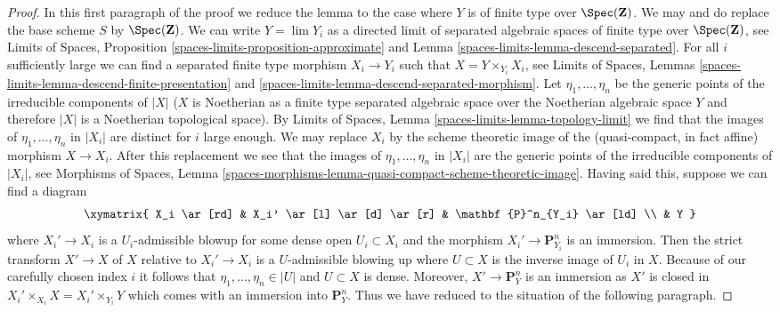 \begin{proof}
In this first paragraph of the proof we reduce the lemma to the case
where $Y$ is of finite type over $\Spec(\mathbf{Z})$.
We may and do replace the base scheme $S$ by $\Spec(\mathbf{Z})$.
We can write $Y = \lim Y_i$ as a directed limit of separated
algebraic spaces of finite type over $\Spec(\mathbf{Z})$, see
Limits of Spaces, Proposition \ref{spaces-limits-proposition-approximate} and
Lemma \ref{spaces-limits-lemma-descend-separated}.
For all $i$ sufficiently large we can find a separated finite type morphism
$X_i \to Y_i$ such that $X = Y \times_{Y_i} X_i$, see
Limits of Spaces, Lemmas
\ref{spaces-limits-lemma-descend-finite-presentation} and
\ref{spaces-limits-lemma-descend-separated-morphism}.
Let $\eta_1, \ldots, \eta_n$ be the generic points of the irreducible
components of $|X|$ ($X$ is Noetherian as a finite type separated
algebraic space over the Noetherian algebraic space $Y$ and therefore
$|X|$ is a Noetherian topological space).
By Limits of Spaces, Lemma \ref{spaces-limits-lemma-topology-limit}
we find that the images of $\eta_1, \ldots, \eta_n$ in $|X_i|$
are distinct for $i$ large enough. We may replace
$X_i$ by the scheme theoretic image of the (quasi-compact, in fact affine)
morphism $X \to X_i$.
After this replacement we see that the images
of $\eta_1, \ldots, \eta_n$ in $|X_i|$ are the generic points of the
irreducible components of $|X_i|$, see
Morphisms of Spaces, Lemma
\ref{spaces-morphisms-lemma-quasi-compact-scheme-theoretic-image}.
Having said this, suppose we can find a diagram
$$
\xymatrix{
X_i \ar[rd] & X_i' \ar[l] \ar[d] \ar[r] & \mathbf{P}^n_{Y_i} \ar[ld] \\
& Y
}
$$
where $X_i' \to X_i$ is a $U_i$-admissible blowup for some dense open
$U_i \subset X_i$ and the morphism $X_i' \to \mathbf{P}^n_{Y_i}$
is an immersion. Then the strict transform $X' \to X$ of $X$ relative
to $X_i' \to X_i$ is a $U$-admissible blowing up where $U \subset X$
is the inverse image of $U_i$ in $X$. Because of our carefully chosen
index $i$ it follows that $\eta_1, \ldots, \eta_n \in |U|$ and
$U \subset X$ is dense. Moreover, $X' \to \mathbf{P}^n_Y$ is an
immersion as $X'$ is closed in
$X_i' \times_{X_i} X = X_i' \times_{Y_i} Y$
which comes with an immersion into $\mathbf{P}^n_Y$. Thus we have reduced
to the situation of the following paragraph.


\end{proof}
